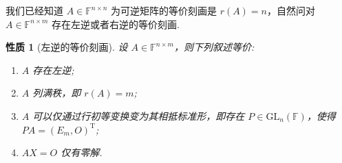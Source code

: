 \documentclass[10pt,openany]{article}
\theoremstyle{thmstyle} %
\theoremstyle{defstyle} %
\theoremstyle{prostyle} %
\newtheorem{property}[theorem]{性质}
\theoremstyle{exastyle}
\theoremstyle{remstyle}
\newcommand{\T}{^{\text{T}}}
\newcommand{\F}{\mathbb{F}}
\newcommand{\gfn}{\text{GL}_n(\mathbb{F})}
\newcommand{\n}{^{n \times n}}
\newcommand{\nm}{^{n \times m}}
\begin{document}
我们已经知道 \( A \in \F\n \) 为可逆矩阵的等价刻画是 \( r(A)=n \)，自然问对 \( A \in \F\nm \) 存在左逆或者右逆的等价刻画.

\begin{property}[左逆的等价刻画] \label{3.2.22}
	设 \( A \in \F\nm \)，则下列叙述等价:
	\begin{enumerate}[(1)]
		\item \( A \) 存在左逆;
		\item \( A \) 列满秩，即 \( r(A)=m \);
		\item \( A \) 可以仅通过行初等变换变为其相抵标准形，即存在 \( P \in \gfn \)，使得 \( PA=(E_m,O)\T \);
		\item \( AX=O \) 仅有零解.
	\end{enumerate}
\end{property}
\end{document}
